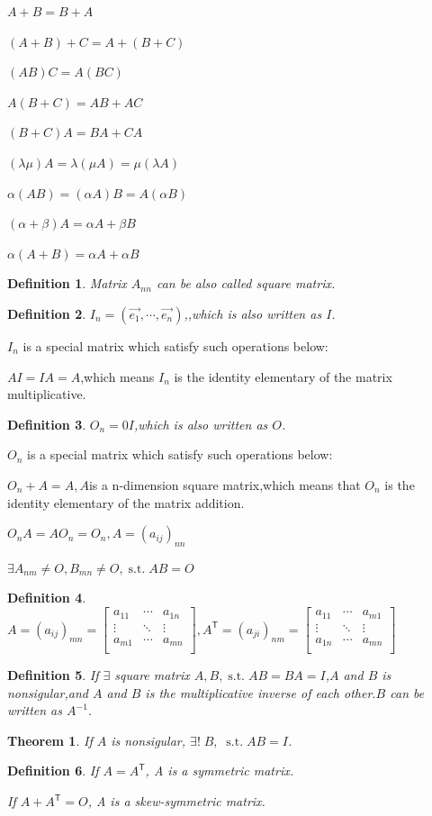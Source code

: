 \documentclass[a4paper,12pt]{report}
\newtheorem{theorem}{Theorem}[section]      %
\newtheorem{definition}{Definition}[section]     %
\newcommand{\st}{\operatorname{s.t.}}
\begin{document}
$A+B=B+A$

$(A+B)+C=A+(B+C)$

$(AB)C=A(BC)$

$A(B+C)=AB+AC$

$(B+C)A=BA+CA$

$(\lambda\mu)A=\lambda(\mu A)=\mu(\lambda A)$

$\alpha(AB)=(\alpha A)B=A(\alpha B)$

$(\alpha+\beta)A=\alpha A+\beta B$

$\alpha(A+B)=\alpha A+\alpha B$
\begin{definition}
    Matrix $A_{nn}$ can be also called square matrix.
\end{definition}
\begin{definition}
    $I_n=(\vec{e_1},\cdots,\vec{e_n})$,,which is also written as $I$. 
\end{definition}

$I_n$ is a special matrix which satisfy such operations below:

$AI=IA=A$,which means $I_n$ is the identity elementary of the matrix multiplicative.
\begin{definition}
    $O_n=0I$,which is also written as $O$. 
\end{definition}

$O_n$ is a special matrix which satisfy such operations below:

$O_n+A=A,A$is a n-dimension square matrix,which means that $O_n$ is the identity elementary of the matrix addition.

$O_nA=AO_n=O_n,A=(a_{ij})_{nn}$

$\exists A_{nm}\neq O,B_{mn}\neq O,\st AB=O$
\begin{definition}
    $A=(a_{ij})_{mn}=    
    \begin{bmatrix}
        a_{11} & \cdots & a_{1n}\\
        \vdots & \ddots & \vdots\\
        a_{m1} & \cdots & a_{mn}\\
    \end{bmatrix}
    ,A^\mathsf{T}=(a_{ji})_{nm}=
    \begin{bmatrix}
        a_{11} & \cdots & a_{m1}\\
        \vdots & \ddots & \vdots\\
        a_{1n} & \cdots & a_{mn}\\
    \end{bmatrix}$
\end{definition}
\begin{definition}
    If $\exists$ square matrix $A,B,\st AB=BA=I$,$A$ and $B$ is nonsigular,and $A$ and $B$ is the multiplicative inverse of each other.$B$ can be written as $A^{-1}$. 
\end{definition}
\begin{theorem}
    If $A$ is nonsigular, $\exists!\;B,\;\st AB=I$.
\end{theorem}
\begin{definition}
    If $A=A^\mathsf{T}$, A is a symmetric matrix.

    If $A+A^\mathsf{T}=O$, A is a skew-symmetric matrix.
\end{definition}
\end{document}
